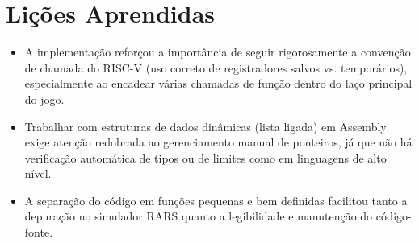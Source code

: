 \documentclass[brazil, a4paper, 11pt]{article}
\begin{document}
    \section*{Lições Aprendidas}
    \begin{itemize}
        \item
        A implementação reforçou a importância de seguir rigorosamente a convenção de chamada do RISC-V (uso correto de registradores salvos vs. temporários), especialmente ao encadear várias chamadas de função dentro do laço principal do jogo.

        \item
        Trabalhar com estruturas de dados dinâmicas (lista ligada) em Assembly exige atenção redobrada ao gerenciamento manual de ponteiros, já que não há verificação automática de tipos ou de limites como em linguagens de alto nível.

        \item
        A separação do código em funções pequenas e bem definidas facilitou tanto a depuração no simulador RARS quanto a legibilidade e manutenção do código-fonte.
    \end{itemize}
\end{document}
